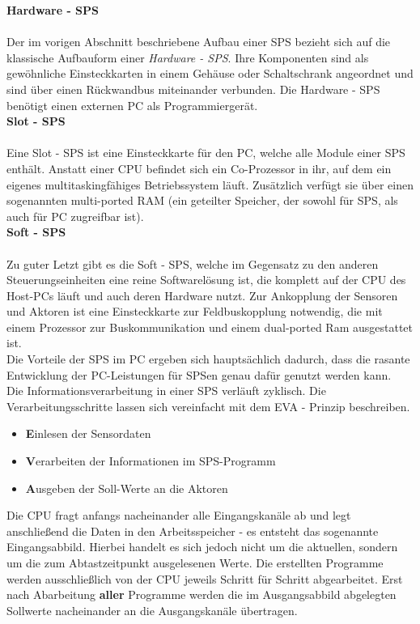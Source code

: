 	\textbf{Hardware - SPS}\\\\
	Der im vorigen Abschnitt beschriebene Aufbau einer SPS bezieht sich auf die klassische Aufbauform einer \textit{Hardware - SPS}. Ihre Komponenten sind als gewöhnliche Einsteckkarten in einem Gehäuse oder Schaltschrank angeordnet und sind über einen Rückwandbus miteinander verbunden. Die Hardware - SPS benötigt einen externen PC als Programmiergerät.\\
	
	\textbf{Slot - SPS}\\\\
	Eine Slot - SPS ist eine Einsteckkarte für den PC, welche alle Module einer SPS enthält. Anstatt einer CPU befindet sich ein Co-Prozessor in ihr, auf dem ein eigenes multitaskingfähiges Betriebssystem läuft. Zusätzlich verfügt sie über einen sogenannten multi-ported RAM (ein geteilter Speicher, der sowohl für SPS, als auch für PC zugreifbar ist).\\
	
	\textbf{Soft - SPS}\\\\
	Zu guter Letzt gibt es die Soft - SPS, welche im Gegensatz zu den anderen Steuerungseinheiten eine reine Softwarelösung ist, die komplett auf der CPU des Host-PCs läuft und auch deren Hardware nutzt. Zur Ankopplung der Sensoren und Aktoren ist eine Einsteckkarte zur Feldbuskopplung notwendig, die mit einem Prozessor zur Buskommunikation und einem dual-ported Ram ausgestattet ist.\\
	
	Die Vorteile der SPS im PC ergeben sich hauptsächlich dadurch, dass die rasante Entwicklung der PC-Leistungen für SPSen genau dafür genutzt werden kann.\\
	
	Die Informationsverarbeitung in einer SPS verläuft zyklisch. Die Verarbeitungsschritte lassen sich vereinfacht mit dem EVA - Prinzip beschreiben.
	
	\begin{itemize}
		\item \textbf{E}inlesen der Sensordaten
		\item \textbf{V}erarbeiten der Informationen im SPS-Programm
		\item \textbf{A}usgeben der Soll-Werte an die Aktoren
	\end{itemize}
	
	Die CPU fragt anfangs nacheinander alle Eingangskanäle ab und legt anschließend die Daten in den Arbeitsspeicher - es entsteht das sogenannte \glqq Eingangsabbild\grqq. Hierbei handelt es sich jedoch nicht um die aktuellen, sondern um die zum Abtastzeitpunkt ausgelesenen Werte. Die erstellten Programme werden ausschließlich von der CPU jeweils Schritt für Schritt abgearbeitet. Erst nach Abarbeitung \textbf{aller} Programme werden die im Ausgangsabbild abgelegten Sollwerte nacheinander an die Ausgangskanäle übertragen. \cite{mseitz_sps} \\ 
	
